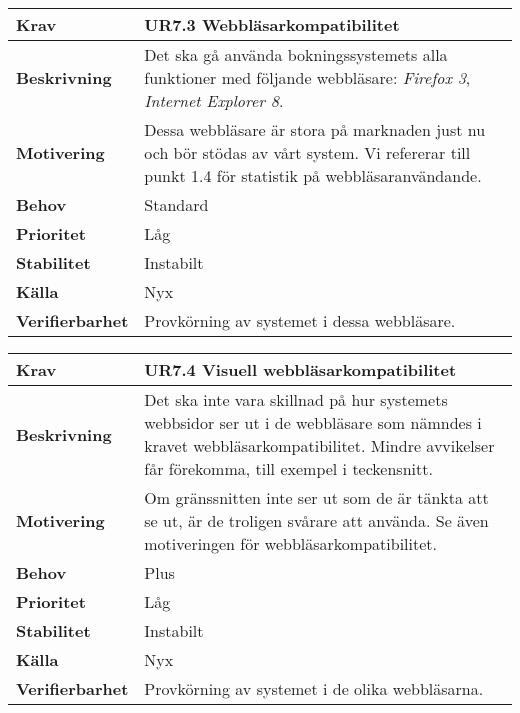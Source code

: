 \documentclass[a4paper, twoside, 11pt, titlepage]{article}
\begin{document}
		\begin{tabular} { p{2.6cm} p{12.5cm} }
			\hline
			\sffamily\textbf{Krav} & \sffamily\textbf{UR7.3 Webbläsarkompatibilitet } \\
			\hline
			\sffamily\textbf{Beskrivning} & Det ska gå använda bokningssystemets alla funktioner med följande webbläsare: \emph{Firefox 3}, \emph{Internet Explorer 8}.  \\
			\hline
			\sffamily\textbf{Motivering} & Dessa webbläsare är stora på marknaden just nu och bör stödas av vårt system. Vi refererar till punkt 1.4 för statistik på webbläsaranvändande.  \\
			\hline
			\sffamily\textbf{Behov} & Standard  \\
			\hline
			\sffamily\textbf{Prioritet} & Låg  \\
			\hline
			\sffamily\textbf{Stabilitet} & Instabilt  \\
			\hline
			\sffamily\textbf{Källa} & Nyx  \\
			\hline
			\sffamily\textbf{Verifierbarhet} & Provkörning av systemet i dessa webbläsare.  \\
			\hline
		\end{tabular}
		\vspace{6mm}

		\begin{tabular} { p{2.6cm} p{12.5cm} }
			\hline
			\sffamily\textbf{Krav} & \sffamily\textbf{UR7.4 Visuell webbläsarkompatibilitet } \\
			\hline
			\sffamily\textbf{Beskrivning} & Det ska inte vara skillnad på hur systemets webbsidor ser ut i de webbläsare som nämndes i kravet webbläsarkompatibilitet. Mindre avvikelser får förekomma, till exempel i teckensnitt.  \\
			\hline
			\sffamily\textbf{Motivering} & Om gränssnitten inte ser ut som de är tänkta att se ut, är de troligen svårare att använda. Se även motiveringen för webbläsarkompatibilitet.  \\
			\hline
			\sffamily\textbf{Behov} & Plus  \\
			\hline
			\sffamily\textbf{Prioritet} & Låg  \\
			\hline
			\sffamily\textbf{Stabilitet} & Instabilt  \\
			\hline
			\sffamily\textbf{Källa} & Nyx  \\
			\hline
			\sffamily\textbf{Verifierbarhet} & Provkörning av systemet i de olika webbläsarna.  \\
			\hline
		\end{tabular}
		\vspace{6mm}
\end{document}
